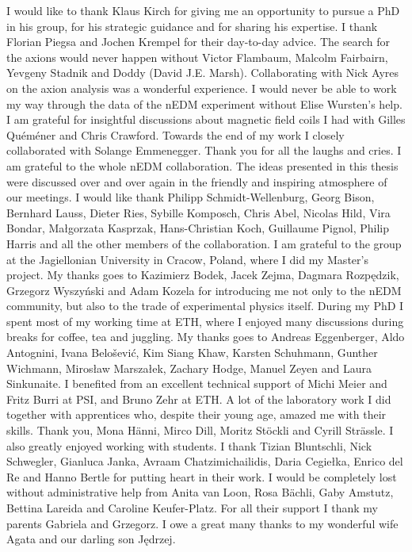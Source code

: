 I would like to thank Klaus Kirch for giving me an opportunity to pursue a PhD in his group, for his strategic guidance and for sharing his expertise.
I thank Florian Piegsa and Jochen Krempel for their day-to-day advice.
The search for the axions would never happen without Victor Flambaum, Malcolm Fairbairn, Yevgeny Stadnik and Doddy (David J.E. Marsh).
Collaborating with Nick Ayres on the axion analysis was a wonderful experience.
I would never be able to work my way through the data of the nEDM experiment without Elise Wursten's help.
I am grateful for insightful discussions about magnetic field coils I had with Gilles Quéméner and Chris Crawford.
Towards the end of my work I closely collaborated with Solange Emmenegger.
Thank you for all the laughs and cries.
I am grateful to the whole nEDM collaboration.
The ideas presented in this thesis were discussed over and over again in the friendly and inspiring atmosphere of our meetings.
I would like thank
Philipp Schmidt-Wellenburg,
Georg Bison,
Bernhard Lauss,
Dieter Ries,
Sybille Komposch,
Chris Abel,
Nicolas Hild,
Vira Bondar,
Małgorzata Kasprzak,
Hans-Christian Koch,
Guillaume Pignol,
Philip Harris
and all the other members of the collaboration.
I am grateful to the group at the Jagiellonian University in Cracow, Poland, where I did my Master's project.
My thanks goes to
Kazimierz Bodek,
Jacek Zejma,
Dagmara Rozpędzik,
Grzegorz Wyszyński and
Adam Kozela
for introducing me not only to the nEDM community, but also to the trade of experimental physics itself.
During my PhD I spent most of my working time at ETH, where I enjoyed many discussions during breaks for coffee, tea and juggling.
My thanks goes to
Andreas Eggenberger,
Aldo Antognini,
Ivana Belo\v{s}ević,
Kim Siang Khaw,
Karsten Schuhmann,
Gunther Wichmann,
Mirosław Marszałek,
Zachary Hodge,
Manuel Zeyen and
Laura Sinkunaite.
I benefited from an excellent technical support of Michi Meier and Fritz Burri at PSI, and Bruno Zehr at ETH\@.
A lot of the laboratory work I did together with apprentices who, despite their young age, amazed me with their skills.
Thank you,
Mona Hänni,
Mirco Dill,
Moritz Stöckli and
Cyrill Strässle.
I also greatly enjoyed working with students.
I thank
Tizian Bluntschli,
Nick Schwegler,
Gianluca Janka,
Avraam Chatzimichailidis,
Daria Cegiełka,
Enrico del Re and
Hanno Bertle for putting heart in their work.
I would be completely lost without administrative help from Anita van Loon, Rosa Bächli,
Gaby Amstutz, Bettina Lareida and Caroline Keufer-Platz.
For all their support I thank my parents Gabriela and Grzegorz.
I owe a great many thanks to my wonderful wife Agata and our darling son Jędrzej.

